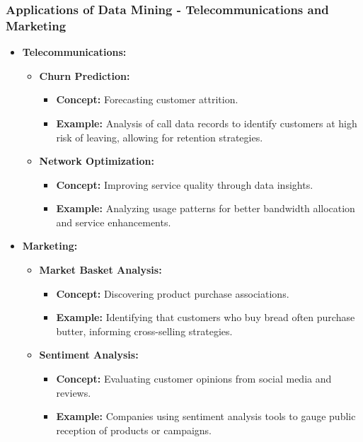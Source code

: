 \documentclass{beamer}
\begin{document}
\begin{frame}[fragile]
    \frametitle{Applications of Data Mining - Telecommunications and Marketing}
    \begin{itemize}
        \item \textbf{Telecommunications:}
            \begin{itemize}
                \item \textbf{Churn Prediction:}
                    \begin{itemize}
                        \item \textbf{Concept:} Forecasting customer attrition.
                        \item \textbf{Example:} Analysis of call data records to identify customers at high risk of leaving, allowing for retention strategies.
                    \end{itemize}
                \item \textbf{Network Optimization:}
                    \begin{itemize}
                        \item \textbf{Concept:} Improving service quality through data insights.
                        \item \textbf{Example:} Analyzing usage patterns for better bandwidth allocation and service enhancements.
                    \end{itemize}
            \end{itemize}
        \item \textbf{Marketing:}
            \begin{itemize}
                \item \textbf{Market Basket Analysis:}
                    \begin{itemize}
                        \item \textbf{Concept:} Discovering product purchase associations.
                        \item \textbf{Example:} Identifying that customers who buy bread often purchase butter, informing cross-selling strategies.
                    \end{itemize}
                \item \textbf{Sentiment Analysis:}
                    \begin{itemize}
                        \item \textbf{Concept:} Evaluating customer opinions from social media and reviews.
                        \item \textbf{Example:} Companies using sentiment analysis tools to gauge public reception of products or campaigns.
                    \end{itemize}
            \end{itemize}
    \end{itemize}
\end{frame}
\end{document}
